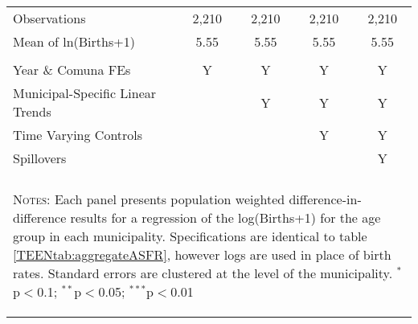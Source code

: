 \begin{table}[!htbp]
\begin{tabular}{@{\extracolsep{5pt}}lcccc}
Observations&2,210&2,210&2,210&2,210\\
Mean of ln(Births+1) &5.55&5.55&5.55&5.55\\
\hline \\[-1.8ex] 
{\small Year \& Comuna FEs}             &Y&Y&Y&Y \\
{\small Municipal-Specific Linear Trends}& &Y&Y&Y \\
{\small Time Varying Controls}           & & &Y&Y \\
{\small Spillovers}                      & & & &Y \\
\hline \hline \\[-1.8ex]
\multicolumn{5}{p{13.8cm}}{\begin{footnotesize}
\textsc{Notes:} Each panel presents population       
weighted difference-in-difference results for a       
regression of the log(Births+1) for the age group in  
each  municipality. Specifications are identical to   
table \ref{TEENtab:aggregateASFR}, however logs are  
 used in place of birth rates. Standard errors are    
clustered at the level of the municipality.
$^{*}$p$<$0.1; $^{**}$p$<$0.05; $^{***}$p$<$0.01\end{footnotesize}}
\normalsize\end{tabular}\end{table}
